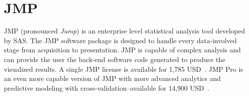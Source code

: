 \section{JMP}

JMP (pronounced \textit{Jump}) is an enterprise level statistical
analysis tool developed by SAS. The JMP software package is designed
to handle every data-involved stage from acquisition to
presentation. JMP is capable of complex analysis and can provide the
user the back-end software code generated to produce the visualized
results. A single JMP license is available for 1,785
USD~\cite{JMPSAS}. JMP Pro is an even more capable version of JMP with
more advanced analytics and predictive modeling with
cross-validation--available for 14,900 USD~\cite{JMPPro}.
